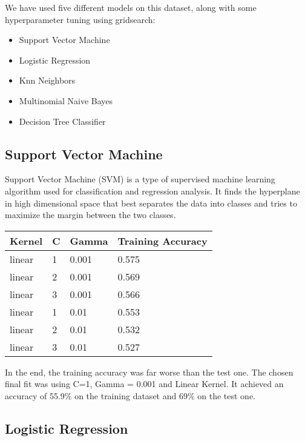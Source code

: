 \documentclass[11pt, a4paper]{article}
\begin{document}
\begin{large}
We have used five different models on this dataset, along with some hyperparameter tuning using gridsearch: 

\begin{itemize}
    \item Support Vector Machine
    \item Logistic Regression
    \item Knn Neighbors
    \item Multinomial Naive Bayes
    \item Decision Tree Classifier
\end{itemize}

\subsection{Support Vector Machine}

Support Vector Machine (SVM) is a type of supervised machine learning algorithm used for classification and regression analysis. It finds the hyperplane in high dimensional space that best separates the data into classes and tries to maximize the margin between the two classes.


\begin{center}
\begin{tabular}{ |l|l|l|l| } 
 \hline
  Kernel & C & Gamma & Training Accuracy \\ 
 \hline
  linear & 1  & 0.001 & 0.575\\ 
 \hline
 linear & 2  & 0.001 & 0.569\\ 
 \hline
 linear & 3 & 0.001 & 0.566\\ 
 \hline
 linear & 1  & 0.01 & 0.553\\ 
 \hline
 linear & 2 & 0.01 & 0.532\\ 
 \hline
 linear & 3 & 0.01 & 0.527\\ 
 \hline

\end{tabular}
\end{center}

In the end, the training accuracy was far worse than the test one. The chosen final fit was using C=1, Gamma = 0.001 and Linear Kernel. It achieved an accuracy of 55.9\% on the training dataset and 69\% on the test one.

\subsection{Logistic Regression}


\end{large}
\end{document}
